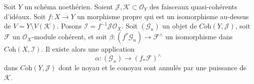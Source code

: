 \begin{lemma}
\label{lemma-inverse-systems-push-pull}
Soit $Y$ un schéma noethérien. Soient
$\mathcal{J}, \mathcal{K} \subset \mathcal{O}_Y$
des faisceaux quasi-cohérents d'idéaux.
Soit $f : X \to Y$ un morphisme propre qui est un isomorphisme au-dessus
de $V = Y \setminus V(\mathcal{K})$.
Posons $\mathcal{I} = f^{-1}\mathcal{J} \mathcal{O}_X$.
Soit $(\mathcal{G}_n)$ un objet de $\textit{Coh}(Y, \mathcal{J})$,
soit $\mathcal{F}$ un $\mathcal{O}_X$-module cohérent, et soit
$\beta : (f^*\mathcal{G}_n)  \to \mathcal{F}^\wedge$ un isomorphisme dans
$\textit{Coh}(X, \mathcal{I})$. Il existe alors une application
$$
\alpha :
(\mathcal{G}_n)
\longrightarrow
(f_*\mathcal{F})^\wedge
$$
dans $\textit{Coh}(Y, \mathcal{J})$ dont le noyau et le
conoyau sont annulés par une puissance de $\mathcal{K}$.
\end{lemma}


